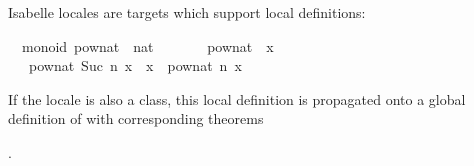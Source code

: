 \begin{isabellebody}
\isamarkuptrue%
%
\isamarkuptrue%
%
\begin{isamarkuptext}%
Isabelle locales are targets which support local definitions:%
\end{isamarkuptext}%
\isamarkuptrue%
%
\isadelimquote
%
\endisadelimquote
%
\isatagquote
{}\isamarkupfalse%
\ {\isacharparenleft}\ monoid{\isacharparenright}\ pow{\isacharunderscore}nat\ {\isacharcolon}{\isacharcolon}\ {\isachardoublequoteopen}nat\ {\isasymRightarrow}\ {\isasymalpha}\ {\isasymRightarrow}\ {\isasymalpha}{\isachardoublequoteclose}\ \isanewline
\ \ {\isachardoublequoteopen}pow{\isacharunderscore}nat\ {}\ x\ {\isacharequal}\ {\isasymone}{\isachardoublequoteclose}\isanewline
\ \ {\isacharbar}\ {\isachardoublequoteopen}pow{\isacharunderscore}nat\ {\isacharparenleft}Suc\ n{\isacharparenright}\ x\ {\isacharequal}\ x\ {\isasymotimes}\ pow{\isacharunderscore}nat\ n\ x{\isachardoublequoteclose}%
\endisatagquote
{\isafoldquote}%
%
\isadelimquote
%
\endisadelimquote
%
\begin{isamarkuptext}%
\noindent If the locale  is also a class, this local
  definition is propagated onto a global definition of  with corresponding theorems

  .


\end{isamarkuptext}
\end{isabellebody}
